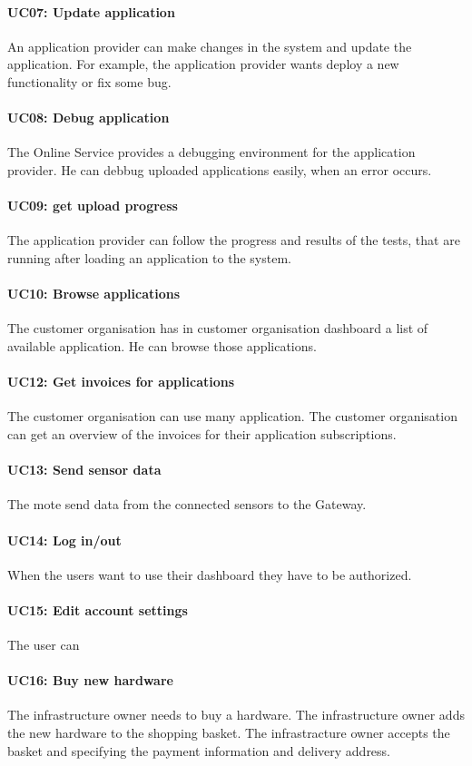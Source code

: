\paragraph{UC07: Update application}
An application provider can make changes in the system and update the application.
For example, the application provider wants deploy a new functionality or fix
some bug.
\paragraph{UC08: Debug application}
The Online Service provides a debugging environment for the application provider.
He can debbug uploaded applications easily, when an error occurs.
\paragraph{UC09: get upload progress}
The application provider can follow the progress and results of the tests, that
are running after loading an application to the system.
\paragraph{UC10: Browse applications}
The customer organisation has in customer organisation dashboard a list of available
application. He can browse those applications.
\paragraph{UC12: Get invoices for applications }
The customer organisation can use many application. The customer organisation can get an
overview of the invoices for their application subscriptions.
\paragraph{UC13: Send sensor data}
The mote send data from the connected sensors to the Gateway.
\paragraph{UC14: Log in/out }
When the users want to use their dashboard they have to be authorized.
\paragraph{UC15: Edit account settings}
The user can
\paragraph{UC16: Buy new hardware }
The infrastructure owner needs to buy a hardware. The infrastructure
owner adds the new hardware to the shopping basket. The infrastracture owner accepts
the basket and specifying the payment information and delivery address.
